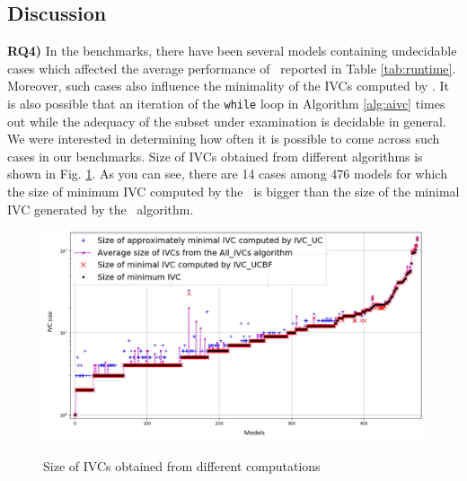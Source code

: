 \subsection {Discussion}
\label{sec:experiment-discussion}
\textbf{RQ4)} In the benchmarks, there have been
several models containing undecidable cases which affected the average
performance of \aivcalg ~reported in Table \ref{tab:runtime}. Moreover, such cases also influence the minimality of the IVCs computed by \aivcalg. It is also possible that an iteration of
the \texttt{while} loop in Algorithm \ref{alg:aivc} times out while
the adequacy of the subset under examination is decidable in general.
We were interested in determining how often it is possible to come across such cases in our benchmarks. Size of IVCs obtained from different algorithms is shown in Fig. \ref{fig:min}.
As you can see, there are 14 cases among 476 models for which the size of
 minimum IVC computed by the \aivcalg ~is bigger than the size of the minimal IVC
 generated by the \ucbfalg ~algorithm.
 \begin{figure}
 \centering
  \includegraphics[width=\textwidth]{figs/min.jpg}
  \label{fig:min}
  \vspace{-0.2in}
  \caption{Size of IVCs obtained from different computations}
\end{figure}
